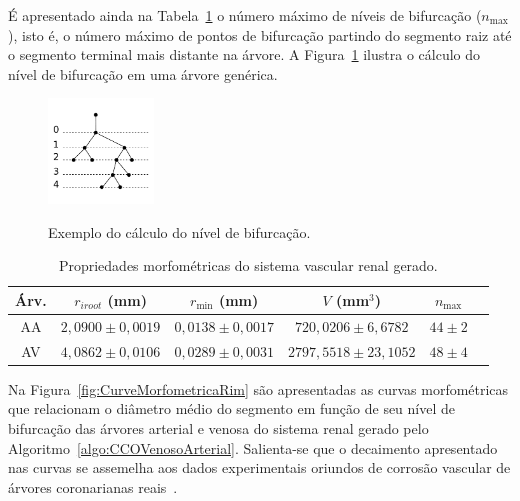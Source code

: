 É apresentado ainda na Tabela~\ref{tab:dados-morfometricos-rim} o número 
máximo de níveis de bifurcação ($n_{\max}$), isto é, o número máximo de 
pontos de bifurcação partindo do segmento raiz até o segmento terminal mais distante
na árvore. A Figura~\ref{fig:nivel-de-bifurcacao} ilustra o cálculo do nível de bifurcação
em uma árvore genérica.

\begin{figure}[!htb]
  \centering
  \captiondelim{: }
  \caption{Exemplo do cálculo do nível de bifurcação.}
  \includegraphics[width=0.25\textwidth]{figuras/modelos-computacionais-de-arvores-circulatorias/nivel-de-bifurcacao.pdf}
  \label{fig:nivel-de-bifurcacao}
\end{figure}

\begin{table}[!htb]
\centering
\captiondelim{: }
\caption{Propriedades morfométricas do sistema vascular renal gerado.}
\begin{tabular}{|c|c|c|c|c|c|}
  \hline 
 Árv.  & $r_{iroot}$ (mm) & $r_{\min}$ (mm) & $V$ (mm$^3$) & $n_{\max}$ \\
\hline
AA & $2,0900 \pm 0,0019$ & $0,0138 \pm 0,0017$ & $720,0206 \pm  6,6782 $ & $44 \pm 2$ \\
AV & $4,0862 \pm 0,0106$ & $0,0289 \pm 0,0031$ & $2797,5518 \pm 23,1052$ & $48 \pm 4$ \\
\hline
\end{tabular}
\label{tab:dados-morfometricos-rim}
\end{table}

Na Figura~\ref{fig:CurveMorfometricaRim} são apresentadas as curvas morfométricas que relacionam o diâmetro médio 
do segmento em função de seu nível de bifurcação das árvores arterial 
e venosa do sistema renal gerado pelo Algoritmo~\ref{algo:CCOVenosoArterial}. 
Salienta-se que o decaimento apresentado nas curvas se assemelha 
aos dados experimentais oriundos de corrosão vascular de árvores coronarianas reais~\cite{Zamir1987}.

